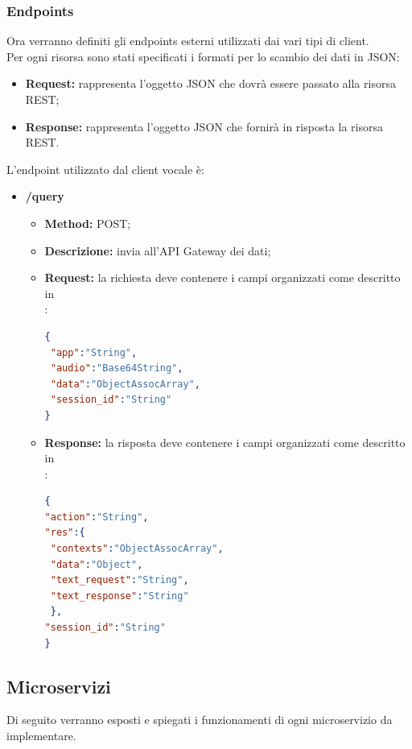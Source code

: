 \subsubsection{Endpoints}
	Ora verranno definiti gli endpoints esterni utilizzati dai vari tipi di client.\\
	Per ogni risorsa sono stati specificati i formati per lo scambio dei dati in JSON: 
	\begin{itemize}
		\item \textbf{Request:} rappresenta l’oggetto JSON che dovrà essere passato alla risorsa REST;
		\item \textbf{Response:} rappresenta l’oggetto JSON che fornirà in risposta la risorsa REST.
	\end{itemize}
	L'endpoint utilizzato dal client vocale è: 
	\begin{itemize}
		\item \textbf{/query}\\
		\begin{itemize}
			\item \textbf{Method:} POST;
			\item \textbf{Descrizione:} invia all'API Gateway dei dati;
			\item \textbf{Request:} la richiesta deve contenere i campi organizzati come descritto in \\:
\begin{lstlisting}[language=json,firstnumber=1]
{
 "app":"String",
 "audio":"Base64String",
 "data":"ObjectAssocArray",
 "session_id":"String"	
}
\end{lstlisting}
			\item \textbf{Response:} la risposta deve contenere i campi organizzati come descritto in \\:
\begin{lstlisting}[language=json,firstnumber=1] 
{
"action":"String",
"res":{
 "contexts":"ObjectAssocArray",
 "data":"Object",
 "text_request":"String",
 "text_response":"String"
 },
"session_id":"String"
}
\end{lstlisting}
		\end{itemize}
	\end{itemize}

\subsection{Microservizi}
Di seguito verranno esposti e spiegati i funzionamenti di ogni microservizio da implementare.
